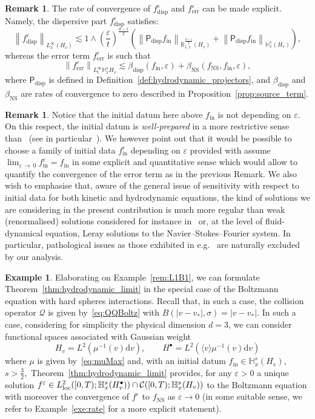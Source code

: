 \documentclass[10pt]{amsart}
\theoremstyle{definition}\newtheorem{defi}[theo]{Definition}\newtheorem{rema}[theo]{Remark}\newtheorem{exam}[theo]{Example}\newtheorem{exem}[theo]{Example}\newtheorem{nota}[theo]{Notation}
\newcommand{\ini}{\mathrm{in}}
\newcommand{\err}{\mathrm{err}}
\newcommand{\ns}{\mathrm{NS}}
\renewcommand{\d}{\mathrm{d}}
\newcommand{\disp}{\mathrm{disp}}
\newcommand{\bbH}{\mathbb{H}}
\newcommand{\bbB}{\mathbb{B}}
\newcommand{\CC}{\mathcal{C}}
\newcommand{\PP}{\mathsf{P}}
\newcommand{\QQ}{\mathcal{Q}}
\newcommand{\Ss}{H}
\newcommand{\Ssp}{H^{\bullet}}
\newcommand*\eps{{\varepsilon}}
\newcommand{\la}{\langle}
\newcommand{\ra}{\rangle}
\newcommand*{\MK}{\mkern 2mu}
\begin{document}
\begin{rema}
The rate of convergence of $f^\eps_\disp$ and $f^\eps_\err$ can be made explicit. Namely, the dispersive part $f^\eps_\disp$ satisfies:
\[
\left\| f^\eps_\disp \right\|_{L^\infty_x \left(\Ss_v \right) } \lesssim 1 \land \left(\frac{\eps}{t} \right)^{ \frac{d-1}{2} } \left(\left\| \PP_\disp f_\ini \right\|_{ \dot{\bbB}^{\frac{d+1}{2}}_{1,1} \left(\Ss_v \right) } + \left\| \PP_\disp f_\ini \right\|_{ \bbH^s_x (\Ss_v) } \right),
\]
whereas the error term $f^\eps_\err$ is such that
\[
\left\| f^\eps_\err \right\|_{ L^\infty_t \bbH^s_x \Ss_v } \lesssim {\beta_{\disp}}(f_\ini, \eps) + \beta_\ns(f_\ns, f_\ini, \eps),
\]
where ${\PP_\disp}$ is defined in Definition~\ref{def:hydrodynamic_projectors}, and ${\beta_{\disp}}$ and $\beta_\ns$ are rates of convergence to zero described in Proposition~\ref{prop:source_term}.
\end{rema}
\begin{rema}
Notice that the initial datum here above $f_\ini$ is not depending on $\eps$. On this respect, the initial datum is \emph{well-prepared} in a more restrictive sense than~\cite{BU1991} (see in particular~\cite[Remark~1.5$\MK$(ii)]{BU1991}). We however point out that it would be possible to choose a family of initial data $f_\ini^{\eps}$ depending on $\eps$ provided with assume $\lim_{\eps\,\to\,0}f_{\ini}^{\eps}=f_\ini$ in some explicit and quantitative sense which would allow to quantify the convergence of the error term as in the previous Remark. We also wish to emphasise that, aware of the general issue of sensitivity with respect to initial data for both kinetic and hydrodynamic equations, the kind of solutions we are considering in the present contribution is much more regular than weak (renormalised) solutions considered for instance in~\cite{golseSR,golseSR1} or, at the level of fluid-dynamical equation, Leray solutions to the Navier--Stokes--Fourier system. In particular, pathological issues as those exhibited in e.g.~\cite{albri,delellis} are naturally excluded by our analysis.
\end{rema}

\begin{exem}\label{exa:L1B1}
Elaborating on Example~\ref{rem:L1B1}, we can formulate Theorem~\ref{thm:hydrodynamic_limit} in the special case of the Boltzmann equation with hard spheres interactions. Recall that, in such a case, the collision operator $\QQ$ is given by~\eqref{eq:QQBoltz} with $B(|v-v_{*}|,\sigma)=|v-v_{*}|.$ In such a case, considering for simplicity the physical dimension $d=3$, we can consider functional spaces associated with Gaussian weight
\[
H_{v}=L^{2}\left(\mu^{-1}(v)\d v\right), \qquad \Ssp=L^2\left(\la v\ra \mu^{-1}(v)\d v\right)
\]
where $\mu$ is given by~\eqref{eq:muMax} and, with an initial datum $f_\ini \in\bbH^s_x (\Ss_v ),$ $s >\frac{3}{2},$ Theorem~\ref{thm:hydrodynamic_limit} provides, for any $\eps >0$ a unique solution $f^\eps \in L^2_{\rm{loc}} ([0, T) ; \bbH^s_x (\Ssp_v)) \cap \CC([0,T);\bbH^s_x(\Ss_v))$ to the Boltzmann equation with moreover the convergence of $f^{\eps}$ to $f_\ns$ as $\eps \to 0$ (in some suitable sense, we refer to Example~\ref{exe:rate} for a more explicit statement).
\end{exem}
\end{document}

